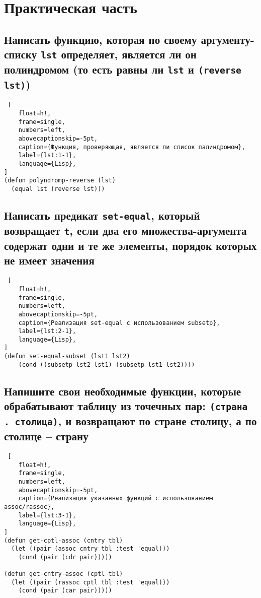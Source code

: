 \chapter{Практическая часть}

\section{Написать функцию, которая по своему аргументу-списку \texttt{lst} определяет, является ли он полиндромом (то есть равны ли \texttt{lst} и \texttt{(reverse lst)})}

\begin{lstlisting} [
	float=h!,
	frame=single,
	numbers=left,
	abovecaptionskip=-5pt,
	caption={Функция, проверяющая, является ли список палиндромом},
	label={lst:1-1},
	language={Lisp},
]
(defun polyndromp-reverse (lst)
  (equal lst (reverse lst)))
\end{lstlisting}

\section{Написать предикат \texttt{set-equal}, который возвращает \texttt{t}, если два его множества-аргумента содержат одни и те же элементы, порядок которых не имеет значения}

\begin{lstlisting} [
	float=h!,
	frame=single,
	numbers=left,
	abovecaptionskip=-5pt,
	caption={Реализация set-equal с использованием subsetp},
	label={lst:2-1},
	language={Lisp},
]
(defun set-equal-subset (lst1 lst2)
    (cond ((subsetp lst2 lst1) (subsetp lst1 lst2))))
\end{lstlisting}

\section{Напишите свои необходимые функции, которые обрабатывают таблицу из точечных пар: \texttt{(страна . столица)}, и возвращают по стране столицу, а по столице -- страну}

\begin{lstlisting} [
	float=h!,
	frame=single,
	numbers=left,
	abovecaptionskip=-5pt,
	caption={Реализация указанных функций с использованием assoc/rassoc},
	label={lst:3-1},
	language={Lisp},
]
(defun get-cptl-assoc (cntry tbl)
  (let ((pair (assoc cntry tbl :test 'equal)))
    (cond (pair (cdr pair)))))

(defun get-cntry-assoc (cptl tbl)
  (let ((pair (rassoc cptl tbl :test 'equal)))
    (cond (pair (car pair)))))
\end{lstlisting}

